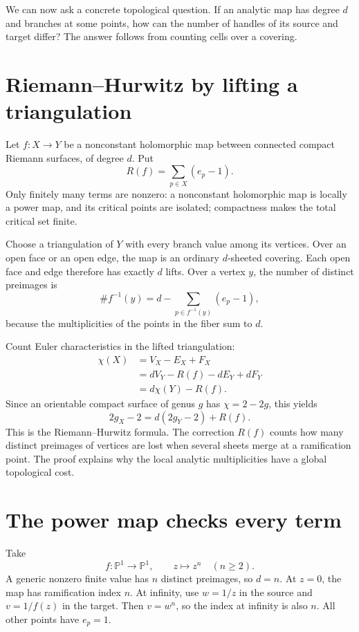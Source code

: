 We can now ask a concrete topological question. If an analytic map has degree \(d\) and branches at some points, how can the number of handles of its source and target differ? The answer follows from counting cells over a covering.

\section{Riemann--Hurwitz by lifting a triangulation}

Let \(f:X\to Y\) be a nonconstant holomorphic map between connected compact Riemann surfaces, of degree \(d\). Put
\[
 R(f)=\sum_{p\in X}(e_p-1).
\]
Only finitely many terms are nonzero: a nonconstant holomorphic map is locally a power map, and its critical points are isolated; compactness makes the total critical set finite.

Choose a triangulation of \(Y\) with every branch value among its vertices. Over an open face or an open edge, the map is an ordinary \(d\)-sheeted covering. Each open face and edge therefore has exactly \(d\) lifts. Over a vertex \(y\), the number of distinct preimages is
\[
 \#f^{-1}(y)
 =d-\sum_{p\in f^{-1}(y)}(e_p-1),
\]
because the multiplicities of the points in the fiber sum to \(d\).

Count Euler characteristics in the lifted triangulation:
\[
\begin{aligned}
 \chi(X)
 &=V_X-E_X+F_X\\
 &=dV_Y-R(f)-dE_Y+dF_Y\\
 &=d\chi(Y)-R(f).
\end{aligned}
\]
Since an orientable compact surface of genus \(g\) has \(\chi=2-2g\), this yields
\[
 \boxed{2g_X-2=d(2g_Y-2)+R(f).}
\]
This is the Riemann--Hurwitz formula. The correction \(R(f)\) counts how many distinct preimages of vertices are lost when several sheets merge at a ramification point. The proof explains why the local analytic multiplicities have a global topological cost.

\section{The power map checks every term}

Take
\[
 f:\mathbb P^1\to\mathbb P^1,\qquad z\longmapsto z^n
 \quad(n\ge2).
\]
A generic nonzero finite value has \(n\) distinct preimages, so \(d=n\). At \(z=0\), the map has ramification index \(n\). At infinity, use \(w=1/z\) in the source and \(v=1/f(z)\) in the target. Then \(v=w^n\), so the index at infinity is also \(n\). All other points have \(e_p=1\).

